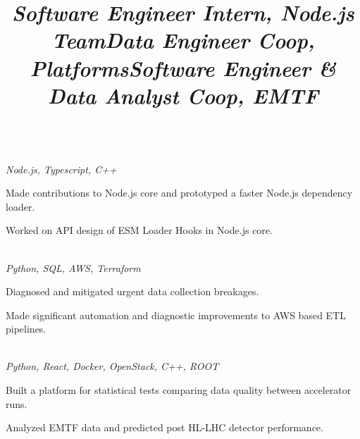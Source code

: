 \documentclass[margin,line,11pt,letterpaper]{style}
\begin{document}
\begin{resume}
    \vspace{-1mm}
    \title{\textit{Software Engineer Intern, Node.js Team}}
    \begin{position}
        \vspace{-4mm}\\
        \emph{Node.js, Typescript, C++}
        \begin{list2}
            \item Made contributions to Node.js core and prototyped a faster Node.js dependency loader.
            \item Worked on API design of ESM Loader Hooks in Node.js core.
        \end{list2}
    \end{position}
    
    \vspace{-1mm}
    \title{\textit{Data Engineer Coop, Platforms}}
    \begin{position}
        \vspace{-4mm}\\
        \emph{Python, SQL, AWS, Terraform}
        \begin{list2}
            \item Diagnosed and mitigated urgent data collection breakages. 
            \item Made significant automation and diagnostic improvements to AWS based ETL pipelines.
        \end{list2}
    \end{position}

    \vspace{-1mm}
    \title{\textit{Software Engineer \& Data Analyst Coop, EMTF}}
    \begin{position}
        \vspace{-4mm}\\
        \emph{Python, React, Docker, OpenStack, C++, ROOT}
        \begin{list2}
            \item Built a platform for statistical tests comparing data quality between accelerator runs.
            \item Analyzed EMTF data and predicted post HL-LHC detector performance.
        \end{list2}
    \end{position}


\end{resume}
\end{document}

